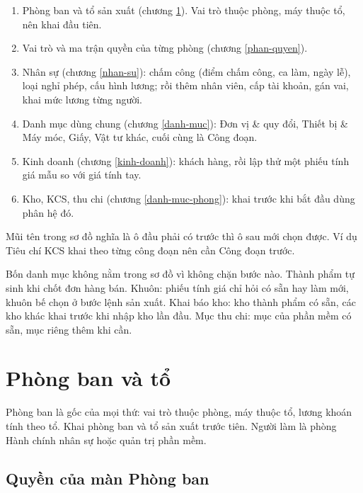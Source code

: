 \documentclass[11pt,a4paper]{article}
\begin{document}
\begin{enumerate}
\item Phòng ban và tổ sản xuất (chương \ref{phong-ban}). Vai trò thuộc phòng, máy thuộc tổ, nên khai đầu tiên.
\item Vai trò và ma trận quyền của từng phòng (chương \ref{phan-quyen}).
\item Nhân sự (chương \ref{nhan-su}): chấm công (điểm chấm công, ca làm, ngày lễ), loại nghỉ phép, cấu hình
lương; rồi thêm nhân viên, cấp tài khoản, gán vai, khai mức lương từng người.
\item Danh mục dùng chung (chương \ref{danh-muc}): Đơn vị \& quy đổi, Thiết bị \& Máy móc, Giấy, Vật tư khác,
cuối cùng là Công đoạn.
\item Kinh doanh (chương \ref{kinh-doanh}): khách hàng, rồi lập thử một phiếu tính giá mẫu so với giá tính tay.
\item Kho, KCS, thu chi (chương \ref{danh-muc-phong}): khai trước khi bắt đầu dùng phân hệ đó.
\end{enumerate}

Mũi tên trong sơ đồ nghĩa là ô đầu phải có trước thì ô sau mới chọn được. Ví dụ Tiêu chí KCS khai theo từng
công đoạn nên cần Công đoạn trước.

Bốn danh mục không nằm trong sơ đồ vì không chặn bước nào. Thành phẩm tự sinh khi chốt đơn hàng bán. Khuôn: phiếu
tính giá chỉ hỏi có sẵn hay làm mới, khuôn bế chọn ở bước lệnh sản xuất. Khai báo kho: kho thành phẩm có sẵn, các
kho khác khai trước khi nhập kho lần đầu. Mục thu chi: mục của phần mềm có sẵn, mục riêng thêm khi cần.

\section{Phòng ban và tổ}\label{phong-ban}

\begin{boicanh}
Phòng ban là gốc của mọi thứ: vai trò thuộc phòng, máy thuộc tổ, lương khoán tính theo tổ. Khai phòng ban và tổ
sản xuất trước tiên. Người làm là phòng Hành chính nhân sự hoặc quản trị phần mềm.
\end{boicanh}

\subsection{Quyền của màn Phòng ban}\label{phong-ban-quyen}
\end{document}
